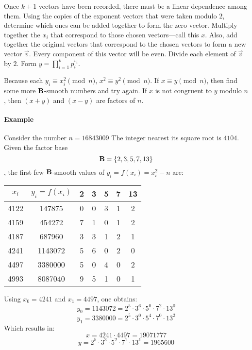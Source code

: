 \documentclass[12pt]{article}
\newcommand{\B}{\ensuremath\mathbf{B}}
\begin{document}
    Once $k+1$ vectors have been recorded, there must be a linear
    dependence among them.  Using the copies of the exponent vectors
    that were taken modulo $2$, determine which ones can be added
    together to form the zero vector.  Multiply together the $x_i$
    that correspond to those chosen vectors---call this $x$.  Also,
    add together the original vectors that correspond to the chosen
    vectors to form a new vector $\vec{v}$.  Every component of
    this vector will be even.  Divide each element of $\vec{v}$ by
    $2$.  Form $y = \prod_{i=1}^{k} p_i^{v_i}$.

    Because each $y_i \equiv x_i^2 \pmod n$, $x^2 \equiv y^2 \pmod
    n$.  If $x \equiv y \pmod n$, then find some more $\B$-smooth
    numbers and try again.  If $x$ is not congruent to $y$ modulo
    $n$, then $(x+y)$ and $(x-y)$ are factors of $n$.

\paragraph{Example}

	Consider the number $n = 16843009$  The integer nearest its
	square root is $4104$.  Given the factor base $$\B = \left\{
	2, 3, 5, 7, 13 \right\}$$, the first few $\B$-smooth values
	of $y_i = f( x_i ) = x_i^2 - n$ are:

	\begin{center}
\begin{tabular}{c|c||c|c|c|c|c}  
    $x_i$ &  $y_i = f(x_i)$ &  2 &   3 &   5 &   7 &  13 \\     
\hline
  4122 &   147875 &       0 &   0 &   3 &   1 &   2 \\ 
  4159 &   454272 &       7 &   1 &   0 &   1 &   2 \\ 
  4187 &   687960 &       3 &   3 &   1 &   2 &   1 \\ 
  4241 &  1143072 &       5 &   6 &   0 &   2 &   0 \\ 
  4497 &  3380000 &       5 &   0 &   4 &   0 &   2 \\ 
  4993 &  8087040 &       9 &   5 &   1 &   0 &   1
\end{tabular}
\end{center}

	Using $x_0 = 4241$ and $x_1 = 4497$, one obtains:
$$ y_0 = 1143072 = 2^5 \cdot 3^6 \cdot 5^0 \cdot 7^2 \cdot 13^0 $$
$$ y_1 = 3380000 = 2^5 \cdot 3^0 \cdot 5^4 \cdot 7^0 \cdot 13^2 $$
	Which results in:
$$ x = 4241 \cdot 4497 = 19071777 $$
$$ y = 2^5 \cdot 3^3 \cdot 5^2 \cdot 7^1 \cdot 13^1 = 1965600 $$
\end{document}
